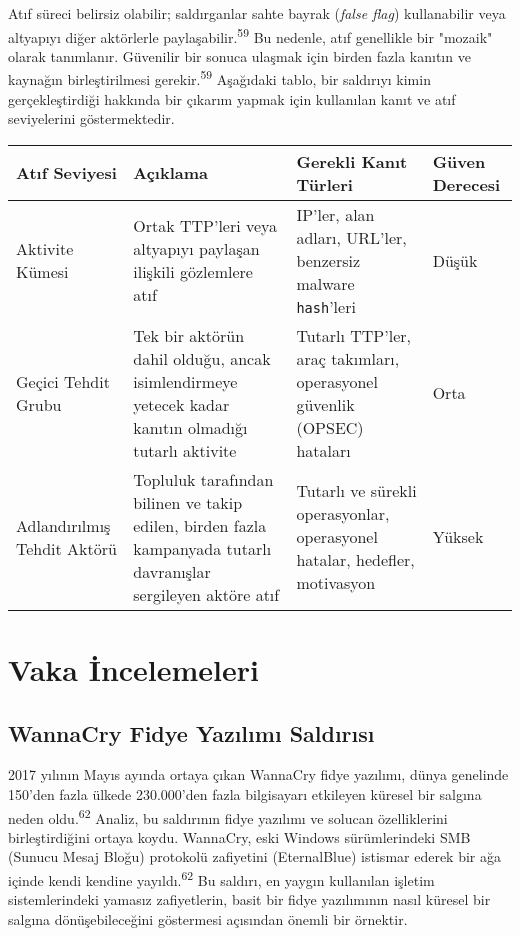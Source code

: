 Atıf süreci belirsiz olabilir; saldırganlar sahte bayrak (\textit{false flag}) kullanabilir veya altyapıyı diğer aktörlerle paylaşabilir.\textsuperscript{59} Bu nedenle, atıf genellikle bir "mozaik" olarak tanımlanır. Güvenilir bir sonuca ulaşmak için birden fazla kanıtın ve kaynağın birleştirilmesi gerekir.\textsuperscript{59}
Aşağıdaki tablo, bir saldırıyı kimin gerçekleştirdiği hakkında bir çıkarım yapmak için kullanılan kanıt ve atıf seviyelerini göstermektedir.

\begin{longtable}{|l|p{4cm}|p{4cm}|p{2cm}|}
\hline
\textbf{Atıf Seviyesi} & \textbf{Açıklama} & \textbf{Gerekli Kanıt Türleri} & \textbf{Güven Derecesi} \\
\hline
Aktivite Kümesi & Ortak TTP'leri veya altyapıyı paylaşan ilişkili gözlemlere atıf & IP'ler, alan adları, URL'ler, benzersiz malware \texttt{hash}'leri & Düşük \\
\hline
Geçici Tehdit Grubu & Tek bir aktörün dahil olduğu, ancak isimlendirmeye yetecek kadar kanıtın olmadığı tutarlı aktivite & Tutarlı TTP'ler, araç takımları, operasyonel güvenlik (OPSEC) hataları & Orta \\
\hline
Adlandırılmış Tehdit Aktörü & Topluluk tarafından bilinen ve takip edilen, birden fazla kampanyada tutarlı davranışlar sergileyen aktöre atıf & Tutarlı ve sürekli operasyonlar, operasyonel hatalar, hedefler, motivasyon & Yüksek \\
\hline
\end{longtable}

\section{Vaka İncelemeleri}

\subsection{WannaCry Fidye Yazılımı Saldırısı}

2017 yılının Mayıs ayında ortaya çıkan WannaCry fidye yazılımı, dünya genelinde 150'den fazla ülkede 230.000'den fazla bilgisayarı etkileyen küresel bir salgına neden oldu.\textsuperscript{62} Analiz, bu saldırının fidye yazılımı ve solucan özelliklerini birleştirdiğini ortaya koydu. WannaCry, eski Windows sürümlerindeki SMB (Sunucu Mesaj Bloğu) protokolü zafiyetini (EternalBlue) istismar ederek bir ağa içinde kendi kendine yayıldı.\textsuperscript{62} Bu saldırı, en yaygın kullanılan işletim sistemlerindeki yamasız zafiyetlerin, basit bir fidye yazılımının nasıl küresel bir salgına dönüşebileceğini göstermesi açısından önemli bir örnektir.

